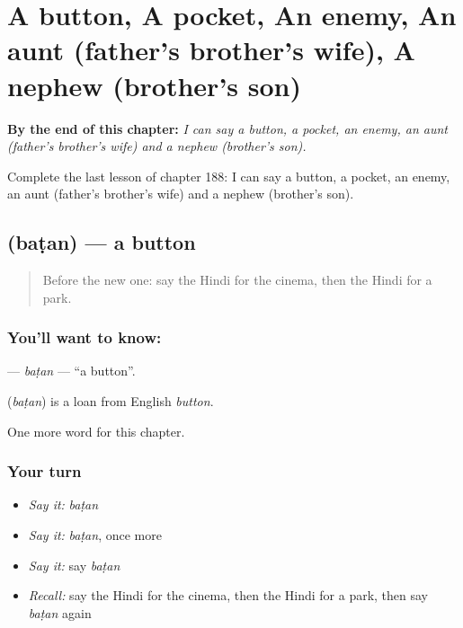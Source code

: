 
\chapter{A button, A pocket, An enemy, An aunt (father's brother's wife), A nephew (brother's son)}
\label{ch:hi-a-button-a-pocket-an-enemy-an-aunt-father-s-brother-s-wife-a-nephew-brother-s-son}

\begin{chapteropening}
\textbf{By the end of this chapter:} \emph{I can say a button, a pocket, an enemy, an aunt (father's brother's wife) and a nephew (brother's son).}

Complete the last lesson of chapter 188: I can say a button, a pocket, an enemy, an aunt (father's brother's wife) and a nephew (brother's son).
\end{chapteropening}

\section[\texorpdfstring{\hi{बटन} (baṭan)}{बटन (baṭan)}]{ (baṭan) — a button}

\label{lesson:HI-C188-batan}



\begin{quote}
Before the new one: say the Hindi for the cinema, then the Hindi for a park.
\end{quote}

\subsection*{You'll want to know: }
\textbf{} — \emph{baṭan} — \textquotedblleft{}a button\textquotedblright{}.

\begin{cousinweb}
\textbf{} (\emph{baṭan}) is a loan from English \emph{button}.
\end{cousinweb}

\begin{grammarlens}[title={What you've built}]
One more word for this chapter.
\end{grammarlens}

\subsection*{Your turn}
\begin{itemize}
\raggedright
  \item \emph{Say it:} \emph{baṭan}
  \item \emph{Say it:} \emph{baṭan}, once more
  \item \emph{Say it:} say \emph{baṭan}
  \item \emph{Recall:} say the Hindi for the cinema, then the Hindi for a park, then say \emph{baṭan} again
\end{itemize}

